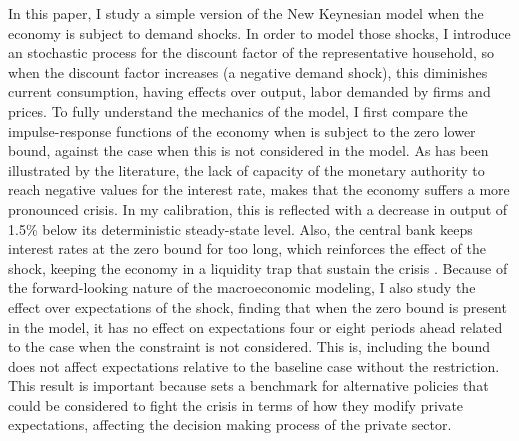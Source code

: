 \documentclass[12pt]{article}
\numberwithin{equation}{section}
\begin{document}
In this paper, I study a simple version of the New Keynesian model when the economy is subject to demand shocks. In order to model those shocks, I introduce an stochastic process for the discount factor of the representative household, so when the discount factor increases (a negative demand shock), this diminishes current consumption, having effects over output, labor demanded by firms and prices. To fully understand the mechanics of the model, I first compare the impulse-response functions of the economy when is subject to the zero lower bound, against the case when this is not considered in the model. As has been illustrated by the literature, the lack of capacity of the monetary authority to reach negative values for the interest rate, makes that the economy suffers a more pronounced crisis. In my calibration, this is reflected with a decrease in output of 1.5\% below its deterministic steady-state level. Also, the central bank keeps interest rates at the zero bound for too long, which reinforces the effect of the shock, keeping the economy in a liquidity trap that sustain the crisis \citep{Werning2012}. Because of the forward-looking nature of the macroeconomic modeling, I also study the effect over expectations of the shock, finding that when the zero bound is present in the model, it has no effect on expectations four or eight periods ahead related to the case when the constraint is not considered. This is, including the bound does not affect expectations relative to the baseline case without the restriction. This result is important because sets a benchmark for alternative policies that could be considered to fight the crisis in terms of how they modify private expectations, affecting the decision making process of the private sector.
\end{document}
